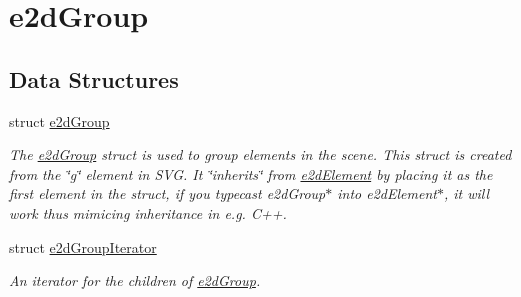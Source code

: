 \hypertarget{group__e2dGroup}{\section{e2d\-Group}
\label{group__e2dGroup}
}
\subsection*{Data Structures}
\begin{DoxyCompactItemize}
\item 
struct \hyperlink{structe2dGroup}{e2d\-Group}
\begin{DoxyCompactList}\small\item\em The \hyperlink{structe2dGroup}{e2d\-Group} struct is used to group elements in the scene. This struct is created from the \char`\"{}g\char`\"{} element in S\-V\-G. It \char`\"{}inherits\char`\"{} from \hyperlink{structe2dElement}{e2d\-Element} by placing it as the first element in the struct, if you typecast e2d\-Group$\ast$ into e2d\-Element$\ast$, it will work thus mimicing inheritance in e.\-g. C++. \end{DoxyCompactList}\item 
struct \hyperlink{structe2dGroupIterator}{e2d\-Group\-Iterator}
\begin{DoxyCompactList}\small\item\em An iterator for the children of \hyperlink{structe2dGroup}{e2d\-Group}. \end{DoxyCompactList}\end{DoxyCompactItemize}
